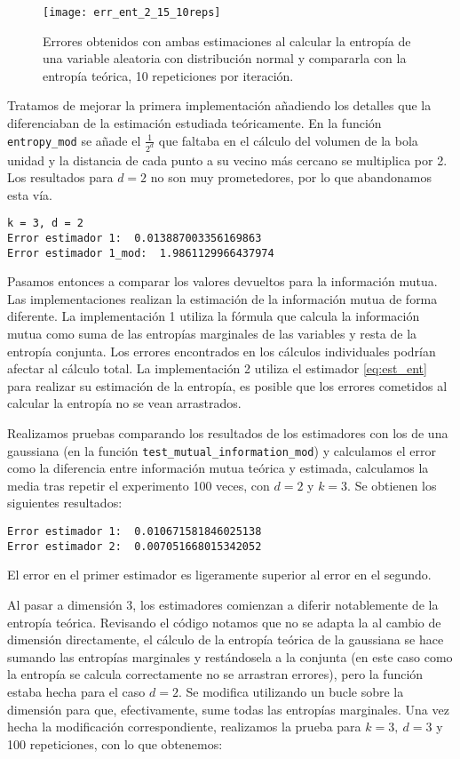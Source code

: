 \documentclass[10pt,a4paper]{article} %
\theoremstyle{definition}
\begin{document}
\begin{figure}[H]
    \centering
    \texttt{[image: err\_ent\_2\_15\_10reps]}
    \caption{Errores obtenidos con ambas estimaciones al calcular la entropía de una variable aleatoria con distribución normal y compararla con la entropía teórica, 10 repeticiones por iteración.}
    \label{fig:err_ent15}
\end{figure}


Tratamos de mejorar la primera implementación añadiendo los detalles que la diferenciaban de la estimación estudiada teóricamente. En la función \texttt{entropy\_mod} se añade el $\frac{1}{2^d}$ que faltaba en el cálculo del volumen de la bola unidad y la distancia de cada punto a su vecino más cercano se multiplica por 2. Los resultados para $d = 2$ no son muy prometedores, por lo que abandonamos esta vía.

\begin{lstlisting}
k = 3, d = 2
Error estimador 1:  0.013887003356169863
Error estimador 1_mod:  1.9861129966437974
\end{lstlisting}


Pasamos entonces a comparar los valores devueltos para la información mutua. Las implementaciones realizan la estimación de la información mutua de forma diferente. La implementación 1 utiliza la fórmula que calcula la información mutua como suma de las entropías marginales de las variables y resta de la entropía conjunta. Los errores encontrados en los cálculos individuales podrían afectar al cálculo total. La implementación 2 utiliza el estimador \ref{eq:est_ent} para realizar su estimación de la entropía, es posible que los errores cometidos al calcular la entropía no se vean arrastrados.

Realizamos pruebas comparando los resultados de los estimadores con los de una gaussiana (en la función \texttt{test\_mutual\_information\_mod}) y calculamos el error como la diferencia entre información mutua teórica y estimada, calculamos la media tras repetir el experimento 100 veces, con $d=2$ y $k=3$. Se obtienen los siguientes resultados:

\begin{lstlisting}
Error estimador 1:  0.010671581846025138
Error estimador 2:  0.007051668015342052
\end{lstlisting}

El error en el primer estimador es ligeramente superior al error en el segundo.

Al pasar a dimensión 3, los estimadores comienzan a diferir notablemente de la entropía teórica. Revisando el código notamos que no se adapta la al cambio de dimensión directamente, el cálculo de la entropía teórica de la gaussiana se hace sumando las entropías marginales y restándosela a la conjunta (en este caso como la entropía se calcula correctamente no se arrastran errores), pero la función estaba hecha para el caso $d = 2$. Se modifica utilizando un bucle sobre la dimensión para que, efectivamente, sume todas las entropías marginales. Una vez hecha la modificación correspondiente, realizamos la prueba para $k = 3,\ d = 3$ y 100 repeticiones, con lo que obtenemos:
\end{document}
